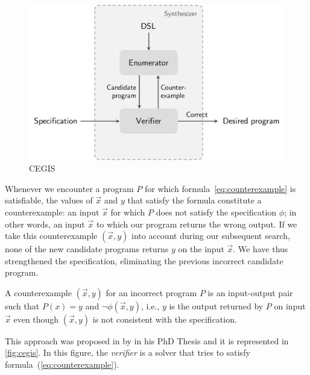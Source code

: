 \begin{figure}
    \centering
    \includegraphics[scale=.35]{pictures/cegis.pdf}
    \caption{\ac{CEGIS}}
    \label{fig:cegis}
\end{figure}

Whenever we encounter a program \(P\) for which formula~\eqref{eq:counterexample} is satisfiable, the values of \(\vec{x}\) and \(y\) that satisfy the formula constitute a counterexample: an input \(\vec{x}\) for which \(P\) does not satisfy the specification \(\phi\); in other words, an input \(\vec{x}\) to which our program returns the wrong output.
If we take this counterexample \((\vec{x}, y)\) into account during our subsequent search, none of the new candidate programs returns \(y\) on the input \(\vec{x}\).
We have thus strengthened the specification, eliminating the previous incorrect candidate program.

\begin{definition}[Counterexample]
A counterexample \((\vec{x}, y)\) for an incorrect program \(P\) is an input-output pair such that \(P(x) = y\) and \(\neg \phi(\vec{x}, y)\), i.e., \(y\) is the output returned by \(P\) on input \(\vec{x}\) even though \((\vec{x}, y)\) is not consistent with the specification.
\end{definition}

This approach was proposed in \citeyear{Solar-LezamaPhDThesis} by \citeauthor{Solar-LezamaPhDThesis} in his PhD Thesis \cite{Solar-LezamaPhDThesis} and it is represented in \autoref{fig:cegis}. In this figure, the \textit{verifier} is a solver that tries to satisfy formula~(\ref{eq:counterexample}).

